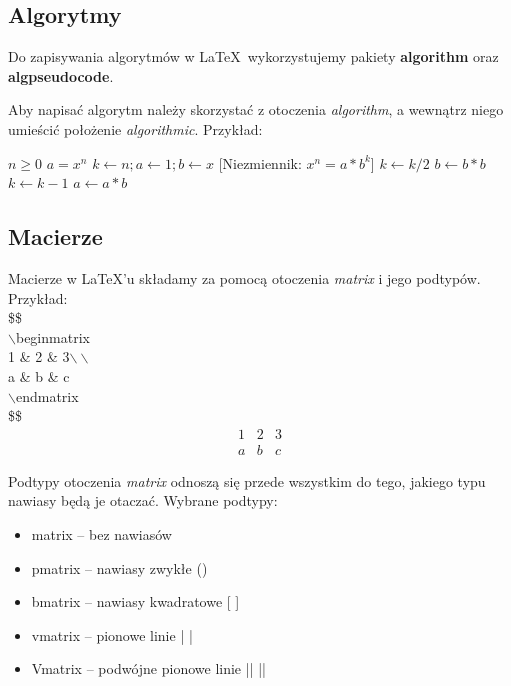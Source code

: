 \documentclass[a4paper, 12pt]{article}
\begin{document}
\subsection{Algorytmy}
Do zapisywania algorytmów w \LaTeX ~wykorzystujemy pakiety \textbf{algorithm} oraz \textbf{algpseudocode}. 

Aby napisać algorytm należy skorzystać z otoczenia \textit{algorithm}, a wewnątrz niego umieścić położenie \textit{algorithmic}. Przykład:

\begin{algorithm}
\caption{Mój algorytm}\label{alg:cap}
\begin{algorithmic}
\Require $ n \geq 0$
\Ensure $ a = x^n$
\State $ k \leftarrow n; a \leftarrow 1; b \leftarrow x$
[Niezmiennik: $x^n = a * b^k$]
	\State $k \leftarrow k/2$
	\State $b \leftarrow b*b$
	\State $k \leftarrow k - 1$
	\State $a \leftarrow a*b$
\EndIf
\EndWhile
\end{algorithmic}
\end{algorithm}

\subsection{Macierze}

Macierze w \LaTeX 'u składamy za pomocą otoczenia \textit{matrix} i jego podtypów. Przykład: \\
\$\$ \\
$\backslash$begin{matrix} \\
1 \& 2 \& 3$\backslash\backslash$ \\
a \& b \& c \\
$\backslash$end{matrix} \\
\$\$ \\

$$
\begin{matrix}
1 & 2 & 3\\
a & b & c
\end{matrix}
$$

Podtypy otoczenia \textit{matrix} odnoszą się przede wszystkim do tego, jakiego typu nawiasy będą je otaczać. Wybrane podtypy:

\begin{itemize}
	\item matrix -- bez nawiasów
	\item pmatrix -- nawiasy zwykłe ()
	\item bmatrix -- nawiasy kwadratowe [ ]
	\item vmatrix -- pionowe linie | |
	\item Vmatrix -- podwójne pionowe linie || ||
\end{itemize}
\end{document}

